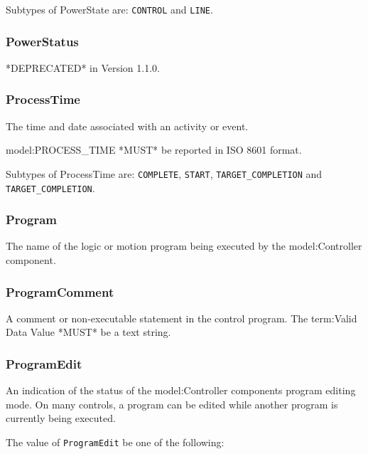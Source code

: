 Subtypes of PowerState are: \texttt{CONTROL} and \texttt{LINE}. 
\FloatBarrier

\subsubsection{PowerStatus}
  \label{sec:PowerStatus}


*DEPRECATED* in Version 1.1.0.

\FloatBarrier

\subsubsection{ProcessTime}
  \label{sec:ProcessTime}


The time and date associated with an activity or event.
  
 {model:PROCESS_TIME} *MUST* be reported in ISO 8601 format.


Subtypes of ProcessTime are: \texttt{COMPLETE}, \texttt{START}, \texttt{TARGET_COMPLETION} and \texttt{TARGET_COMPLETION}. 
\FloatBarrier

\subsubsection{Program}
  \label{sec:Program}


The name of the logic or motion program being executed by the {model:Controller} component.

\FloatBarrier

\subsubsection{ProgramComment}
  \label{sec:ProgramComment}


A comment or non-executable statement in the control program.
 The {term:Valid Data Value} *MUST* be a text string.

\FloatBarrier

\subsubsection{ProgramEdit}
  \label{sec:ProgramEdit}


An indication of the status of the {model:Controller} components program editing mode. 
 On many controls, a program can be edited while another program is currently being executed.


The value of \texttt{ProgramEdit} \MUST be one of the following: 

